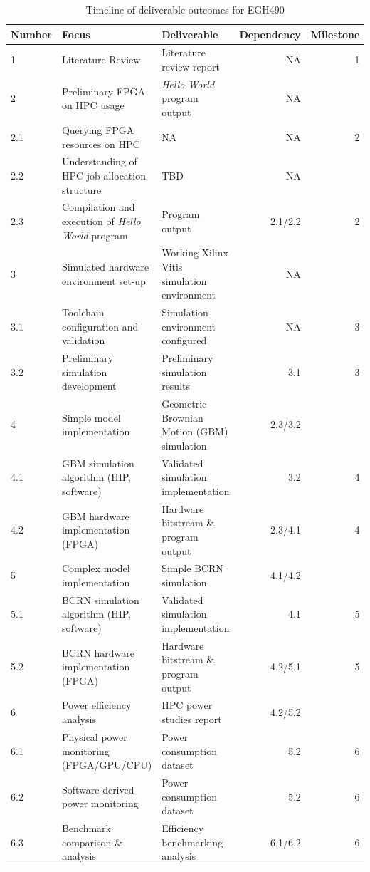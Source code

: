 \documentclass[11pt, a4paper]{article}
\begin{document}
	\begin{table}[h!]
		\begin{tabularx}{\textwidth}{|l|X|X|r|r|}\hline
			Number & Focus & Deliverable & Dependency & Milestone\\\hline
			1 & Literature Review & Literature review report & NA & 1 \\
			2 & Preliminary FPGA on HPC usage& \textit{Hello World} program output & NA &  \\
			2.1 & Querying FPGA resources on HPC & NA & NA & 2 \\
			2.2 & Understanding of HPC job allocation structure & TBD & NA &  \\
			2.3 & Compilation and execution of \textit{Hello World} program  & Program output & 2.1/2.2 & 2 \\
			3 & Simulated hardware environment set-up & Working Xilinx Vitis simulation environment & NA &  \\
			3.1 & Toolchain configuration and validation & Simulation environment configured & NA & 3 \\
			3.2 & Preliminary simulation development & Preliminary simulation results & 3.1 & 3 \\
			4 & Simple model implementation & Geometric Brownian Motion (GBM) simulation & 2.3/3.2 &  \\
			4.1 & GBM simulation algorithm (HIP, software) & Validated simulation implementation & 3.2 & 4 \\
			4.2 & GBM hardware implementation (FPGA) & Hardware bitstream \& program output & 2.3/4.1 & 4 \\
			5 & Complex model implementation & Simple BCRN simulation & 4.1/4.2 &  \\
			5.1 & BCRN simulation algorithm (HIP, software) & Validated simulation implementation & 4.1 & 5 \\
			5.2 & BCRN hardware implementation (FPGA) & Hardware bitstream \& program output & 4.2/5.1 & 5 \\
			6 & Power efficiency analysis & HPC power studies report & 4.2/5.2 &  \\
			6.1 & Physical power monitoring (FPGA/GPU/CPU) & Power consumption dataset & 5.2 & 6 \\
			6.2 & Software-derived power monitoring & Power consumption dataset & 5.2 & 6 \\
			6.3 & Benchmark comparison \& analysis & Efficiency benchmarking analysis & 6.1/6.2 & 6 \\\hline
		\end{tabularx}	
		\caption{Timeline of deliverable outcomes for EGH490}
	\end{table}
	
\end{document}
